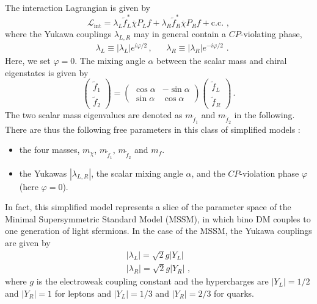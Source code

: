\documentclass[11pt]{article}
\newcommand{\bea}{\begin{eqnarray}}
\newcommand{\eea}{\end{eqnarray}}
\begin{document}
The interaction Lagrangian is given by
%
\begin{equation}
\label{eq:Lint}
  \mathcal{L}_{\text{int}}=\lambda_{L}\widetilde{f}_{L}^{\ast}\overline{\chi}P_{L}f+\lambda_{R}\widetilde{f}_{R}^{\ast}\overline{\chi}P_{R}f+\text{c.c.} \,\,,
\end{equation}
%
where the Yukawa couplings $\lambda_{L,R}$ may in general contain a $CP$-violating phase,
%
\begin{align}
  &\lambda_{L}\equiv\left|\lambda_{L}\right|e^{i\varphi/2}\,,& &\lambda_{R}\equiv\left|\lambda_{R}\right|e^{-i\varphi/2} \,\,.
\label{yukawasimplified}
\end{align}
%
Here, we set $\varphi=0$. The mixing angle $\alpha$ between the scalar mass and chiral eigenstates is given by
%
\begin{equation} \label{mixingangle}
  \left(\begin{array}{c}
    \widetilde{f}_{1} \\ \widetilde{f}_{2}
    \end{array}\right)
  =\left(
  \begin{array}{cc}
    \cos\alpha & -\sin\alpha \\
    \sin\alpha & \cos\alpha
  \end{array}\right)\left(
  \begin{array}{c}
    \widetilde{f}_{L} \\ \widetilde{f}_{R}
  \end{array}\right)\,.
\end{equation}
%
The two scalar mass eigenvalues are denoted as $m_{\widetilde{f}_{1}}$ and $m_{\widetilde{f}_{2}}$ in the following. There are thus the following free parameters in this class of simplified models \cite{Fukushima:2014yia}:
%
\begin{itemize}
\item the four masses, $m_{\chi}$, $m_{\widetilde{f}_{1}}$, $m_{\widetilde{f}_{2}}$ and $m_{f}$. 

\item the Yukawas $|\lambda_{L,R}|$, the scalar mixing angle $\alpha$, and the $CP$-violation phase $\varphi$ (here $\varphi=0$). 
\end{itemize}


In fact, this simplified model represents a slice of the parameter space of the Minimal Supersymmetric Standard Model (MSSM), in which bino DM couples to one generation of light sfermions. In the case of the MSSM, the Yukawa couplings are given by  
%
\bea
|\lambda_{L}|=\sqrt{2}g|Y_{L}| \nonumber \\
|\lambda_{R}|=\sqrt{2}g|Y_{R}| \,\, ,
\label{susyyukawa}
\eea
%
where $g$ is the electroweak coupling constant and the hypercharges are $|Y_{L}|=1/2$ and $|Y_{R}|=1$ for leptons and $|Y_{L}|=1/3$ and $|Y_{R}|=2/3$ for quarks. 
\end{document}
